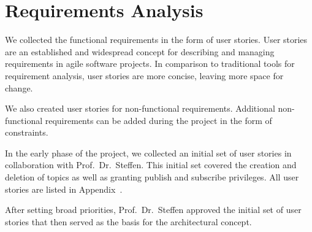 \section{Requirements Analysis}

We collected the functional requirements in the form of user stories.
User stories are an established and widespread concept for describing and managing requirements in agile software projects.
In comparison to traditional tools for requirement analysis, user stories are more concise, leaving more space for change. \cite{wirdemann2017scrum}

We also created user stories for non-functional requirements.
Additional non-functional requirements can be added during the project in the form of constraints. \cite{wirdemann2017scrum}

In the early phase of the project, we collected an initial set of user stories in collaboration with Prof.\ Dr.\ Steffen.
This initial set covered the creation and deletion of \glspl{topic} as well as  granting publish and subscribe privileges.
All user stories are listed in Appendix~.

After setting broad priorities, Prof.\ Dr.\ Steffen approved the initial set of user stories that then served as the basis for the architectural concept.